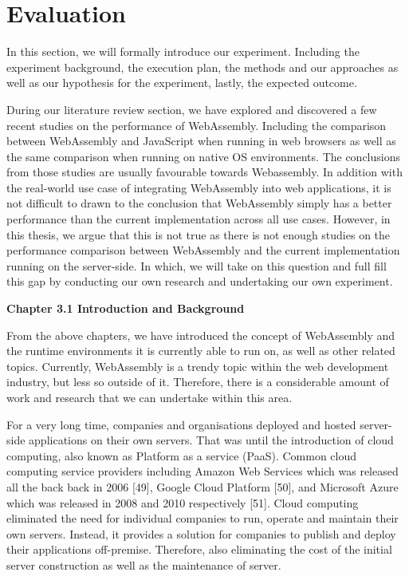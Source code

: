 \chapter{Evaluation} \label{chap:evaluation}

In this section, we will formally introduce our experiment. Including the experiment background, the execution plan, the methods and our approaches as well as our hypothesis for the experiment, lastly, the expected outcome.

During our literature review section, we have explored and discovered a few recent studies on the performance of WebAssembly. Including the comparison between WebAssembly and JavaScript when running in web browsers as well as the same comparison when running on native OS environments. The conclusions from those studies are usually favourable towards Webassembly. In addition with the real-world use case of integrating WebAssembly into web applications, it is not difficult to drawn to the conclusion that WebAssembly simply has a better performance than the current implementation across all use cases. However, in this thesis, we argue that this is not true as there is not enough studies on the performance comparison between WebAssembly and the current implementation running on the server-side. In which, we will take on this question and full fill this gap by conducting our own research and undertaking our own experiment.

\bigskip
\textbf{{\Large Chapter 3.1 Introduction and Background}}

From the above chapters, we have introduced the concept of WebAssembly and the runtime environments it is currently able to run on, as well as other related topics. Currently, WebAssembly is a trendy topic within the web development industry, but less so outside of it. Therefore, there is a considerable amount of work and research that we can undertake within this area.

For a very long time, companies and organisations deployed and hosted server-side applications on their own servers. That was until the introduction of cloud computing, also known as Platform as a service (PaaS). Common cloud computing service providers including Amazon Web Services which was released all the back back in 2006 [49], Google Cloud Platform [50], and Microsoft Azure which was released in 2008 and 2010 respectively [51]. Cloud computing eliminated the need for individual companies to run, operate and maintain their own servers. Instead, it provides a solution for companies to publish and deploy their applications off-premise. Therefore, also eliminating the cost of the initial server construction as well as the maintenance of server.

